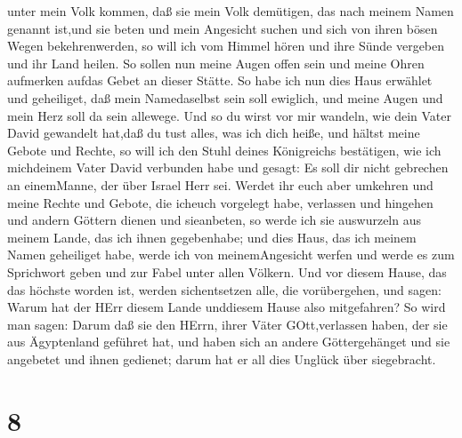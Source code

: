 unter mein Volk kommen,  daß sie mein Volk demütigen, das
nach meinem Namen genannt ist,und sie beten und mein Angesicht suchen
und sich von ihren bösen Wegen bekehrenwerden, so will ich vom Himmel
hören und ihre Sünde vergeben und ihr Land heilen.  So
sollen nun meine Augen offen sein und meine Ohren aufmerken aufdas Gebet
an dieser Stätte.  So habe ich nun dies Haus erwählet und
geheiliget, daß mein Namedaselbst sein soll ewiglich, und meine Augen
und mein Herz soll da sein allewege.  Und so du wirst vor
mir wandeln, wie dein Vater David gewandelt hat,daß du tust alles, was
ich dich heiße, und hältst meine Gebote und Rechte,  so
will ich den Stuhl deines Königreichs bestätigen, wie ich michdeinem
Vater David verbunden habe und gesagt: Es soll dir nicht gebrechen an
einemManne, der über Israel Herr sei.  Werdet ihr euch aber
umkehren und meine Rechte und Gebote, die icheuch vorgelegt habe,
verlassen und hingehen und andern Göttern dienen und sieanbeten,
 so werde ich sie auswurzeln aus meinem Lande, das ich
ihnen gegebenhabe; und dies Haus, das ich meinem Namen geheiliget habe,
werde ich von meinemAngesicht werfen und werde es zum Sprichwort geben
und zur Fabel unter allen Völkern.  Und vor diesem Hause,
das das höchste worden ist, werden sichentsetzen alle, die vorübergehen,
und sagen: Warum hat der HErr diesem Lande unddiesem Hause also
mitgefahren?  So wird man sagen: Darum daß sie den HErrn,
ihrer Väter GOtt,verlassen haben, der sie aus Ägyptenland geführet hat,
und haben sich an andere Göttergehänget und sie angebetet und ihnen
gedienet; darum hat er all dies Unglück über siegebracht.

\hypertarget{section-7}{%
\section{8}\label{section-7}}

